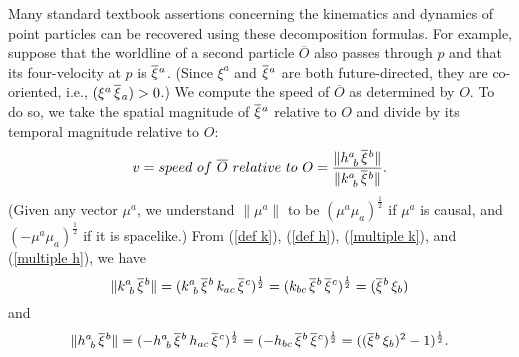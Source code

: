 \documentclass [12] {article}
\theoremstyle{plain}
\numberwithin{figure}{subsection}
\numberwithin{proposition}{subsection}
\begin{document}
Many standard textbook assertions concerning the kinematics and dynamics of point particles can be recovered using these decomposition formulas. For example, suppose that the worldline of a second particle $\overline{O}$ also passes through $p$ and that its four-velocity at $p$ is $\overline{\xi}\hspace{.05em}^{a}$.  (Since $\xi^a$ and $\overline{\xi}\hspace{.05em}^{a}$ are both future-directed, they are co-oriented, i.e., $(\xi^a \, \overline{\xi}\hspace{.05em}_{a}) > 0$.) We compute the speed of $\overline{O}$ as determined by $O$. To do so, we take the spatial magnitude of $\overline{\xi}\hspace{.05em}^a$  relative to $O$ and divide by its temporal magnitude relative to $O$:
\begin{equation}
\label{v-def }
v = speed \ of  \  \overline{O} \   relative \   to \   O = \frac{\|h^a_{\ b} \,\overline{\xi}\hspace{.05em}^b \|}{\|k^a_{\ b} \,\overline{\xi}\hspace{.05em}^b \|}. 
\end{equation}
(Given any vector $\mu^a$,  we understand  $\|\mu^a\|$ to be
  $(\mu^a \mu_a)^\frac{1}{2}$ if $\mu^a$ is causal, and  $(-\mu^a \mu_a)^\frac{1}{2}$ if it is spacelike.)  
From (\ref{def k}), (\ref{def h}), (\ref{multiple k}), and (\ref{multiple h}), we have
\begin{equation}
\label{k-component}
\|k^a_{\ b} \,\overline{\xi}\hspace{.05em}^b \|= (k^a_{\ b} \, \overline{\xi}\hspace{.05em}^b \, k_{ac} \, \overline{\xi}\hspace{.05em}^c)^\frac{1}{2} = (k_{bc} \, \overline{\xi}\hspace{.05em}^b \, \overline{\xi}\hspace{.05em}^c)^\frac{1}{2} = (\overline{\xi}\hspace{.05em}^b \, \xi_b)   
\end{equation}
and
\begin{equation}
\label{h-component}
\|h^a_{\ b} \,\overline{\xi}\hspace{.05em}^b \|= (-h^a_{\ b} \, \overline{\xi}\hspace{.05em}^b \, h_{ac} \, \overline{\xi}\hspace{.05em}^c)^\frac{1}{2} = (-h_{bc} \, \overline{\xi}\hspace{.05em}^b \, \overline{\xi}\hspace{.05em}^c)^\frac{1}{2} = ((\overline{\xi}\hspace{.05em}^b \, \xi_b)^2 - 1)^{\frac{1}{2}}.  
\end{equation} 
\end{document}
